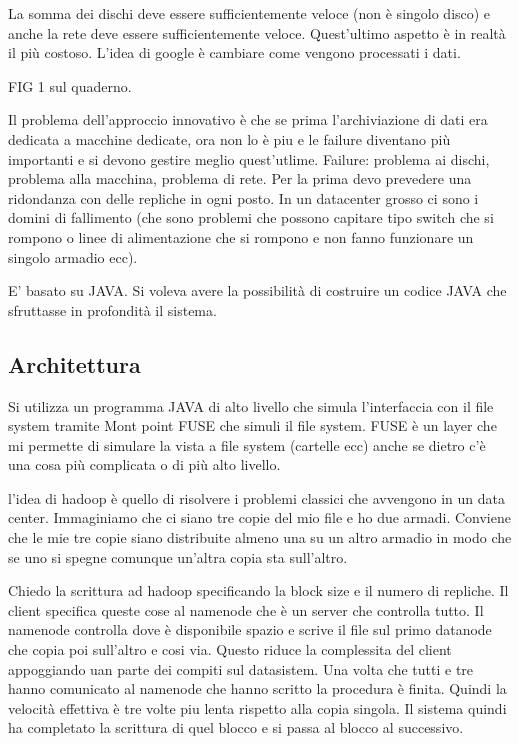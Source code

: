 La somma dei dischi deve essere sufficientemente veloce (non è singolo
disco) e anche la rete deve essere sufficientemente veloce. Quest'ultimo
aspetto è in realtà il più costoso. L'idea di google è cambiare come
vengono processati i dati.

FIG 1 sul quaderno.

Il problema dell'approccio innovativo è che se prima l'archiviazione di
dati era dedicata a macchine dedicate, ora non lo è piu e le failure
diventano più importanti e si devono gestire meglio quest'utlime.
Failure: problema ai dischi, problema alla macchina, problema di rete.
Per la prima devo prevedere una ridondanza con delle repliche in ogni
posto. In un datacenter grosso ci sono i domini di fallimento (che sono
problemi che possono capitare tipo switch che si rompono o linee di
alimentazione che si rompono e non fanno funzionare un singolo armadio
ecc).

E' basato su JAVA. Si voleva avere la possibilità di costruire un codice
JAVA che sfruttasse in profondità il sistema. \subsection{Architettura}
Si utilizza un programma JAVA di alto livello che simula l'interfaccia
con il file system tramite Mont point FUSE che simuli il file system.
FUSE è un layer che mi permette di simulare la vista a file system
(cartelle ecc) anche se dietro c'è una cosa più complicata o di più alto
livello.

l'idea di hadoop è quello di risolvere i problemi classici che avvengono
in un data center. Immaginiamo che ci siano tre copie del mio file e ho
due armadi. Conviene che le mie tre copie siano distribuite almeno una
su un altro armadio in modo che se uno si spegne comunque un'altra copia
sta sull'altro.

Chiedo la scrittura ad hadoop specificando la block size e il numero di
repliche. Il client specifica queste cose al namenode che è un server
che controlla tutto. Il namenode controlla dove è disponibile spazio e
scrive il file sul primo datanode che copia poi sull'altro e cosi via.
Questo riduce la complessita del client appoggiando uan parte dei
compiti sul datasistem. Una volta che tutti e tre hanno comunicato al
namenode che hanno scritto la procedura è finita. Quindi la velocità
effettiva è tre volte piu lenta rispetto alla copia singola. Il sistema
quindi ha completato la scrittura di quel blocco e si passa al blocco al
successivo.

